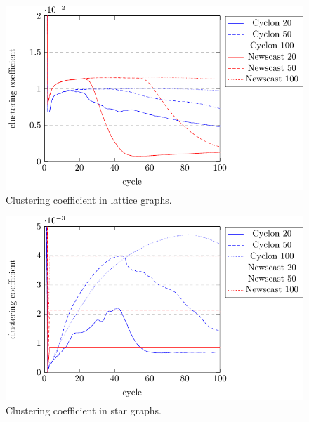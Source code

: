 \documentclass[a4paper]{ifacconf}
\begin{document}
\begin{figure}[p]
    \centering
    \includegraphics[width=\linewidth]{"figures/clustering coefficient lattice"}
    \caption{Clustering coefficient in lattice graphs.}
    \label{fig:clustering-coefficient-lattice}
\end{figure}
\begin{figure}[p]
    \centering
    \includegraphics[width=\linewidth]{"figures/clustering coefficient star"}
    \caption{Clustering coefficient in star graphs.}
    \label{fig:clustering-coefficient-star}
\end{figure}
\end{document}
